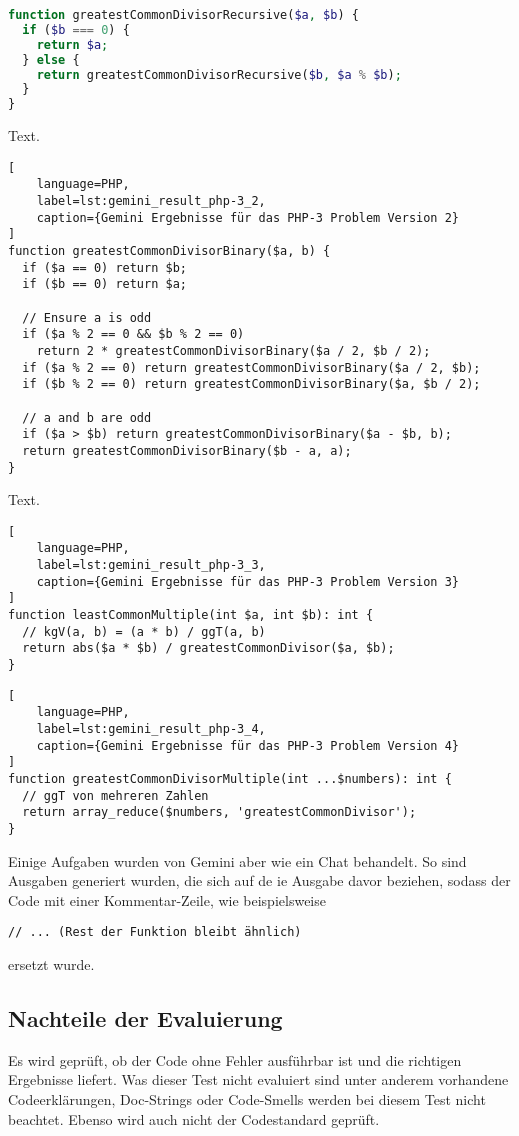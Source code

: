 \begin{lstlisting}[language=PHP,label=lst:gemini_result_php-3_1,caption={Gemini Ergebnis für das PHP-3 Problem Version 1}]
function greatestCommonDivisorRecursive($a, $b) {
  if ($b === 0) {
    return $a;
  } else {
    return greatestCommonDivisorRecursive($b, $a % $b);
  }
}
\end{lstlisting}

Text.

\begin{lstlisting}[
	language=PHP,
	label=lst:gemini_result_php-3_2,
	caption={Gemini Ergebnisse für das PHP-3 Problem Version 2}
]
function greatestCommonDivisorBinary($a, b) {
  if ($a == 0) return $b;
  if ($b == 0) return $a;

  // Ensure a is odd
  if ($a % 2 == 0 && $b % 2 == 0)
    return 2 * greatestCommonDivisorBinary($a / 2, $b / 2);
  if ($a % 2 == 0) return greatestCommonDivisorBinary($a / 2, $b);
  if ($b % 2 == 0) return greatestCommonDivisorBinary($a, $b / 2);

  // a and b are odd
  if ($a > $b) return greatestCommonDivisorBinary($a - $b, b);
  return greatestCommonDivisorBinary($b - a, a);
}
\end{lstlisting}

Text.

\begin{lstlisting}[
	language=PHP,
	label=lst:gemini_result_php-3_3,
	caption={Gemini Ergebnisse für das PHP-3 Problem Version 3}
]
function leastCommonMultiple(int $a, int $b): int {
  // kgV(a, b) = (a * b) / ggT(a, b)
  return abs($a * $b) / greatestCommonDivisor($a, $b);
}
\end{lstlisting}

\begin{lstlisting}[
	language=PHP,
	label=lst:gemini_result_php-3_4,
	caption={Gemini Ergebnisse für das PHP-3 Problem Version 4}
]
function greatestCommonDivisorMultiple(int ...$numbers): int {
  // ggT von mehreren Zahlen
  return array_reduce($numbers, 'greatestCommonDivisor');
}
\end{lstlisting}

Einige Aufgaben wurden von Gemini aber wie ein Chat behandelt. So sind Ausgaben generiert wurden, die sich auf de
ie Ausgabe davor beziehen, sodass der Code mit einer Kommentar-Zeile, wie beispielsweise

\texttt{// ... (Rest der Funktion bleibt ähnlich)}

ersetzt wurde.

\subsection{Nachteile der Evaluierung}
Es wird geprüft, ob der Code ohne Fehler ausführbar ist und die richtigen Ergebnisse liefert. Was dieser Test nicht evaluiert sind unter anderem vorhandene Codeerklärungen, Doc-Strings oder Code-Smells werden bei diesem Test nicht beachtet. Ebenso wird auch nicht der Codestandard geprüft.\vspace{0.2cm}


